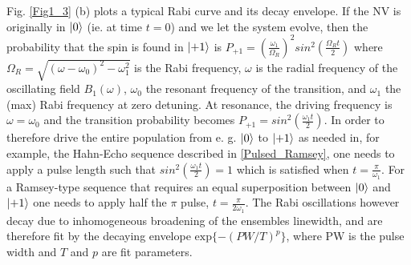 Fig. \ref{Fig1_3} (b) plots a typical Rabi curve and its decay envelope. If the NV is originally in $\ket{0}$ (ie. at time $t = 0$) and we let the system evolve, then the probability that the spin is found in $\ket{+1}$ is $P_{+1} = \left(\frac{\omega_1}{\Omega_R}\right)^2 sin^2\left(\frac{\Omega_R t}{2}\right)$ where $\Omega_R = \sqrt{(\omega-\omega_0)^2-\omega_1^2}$ is the Rabi frequency, $\omega$ is the radial frequency of the oscillating field $B_1(\omega)$, $\omega_0$ the resonant frequency of the transition, and $\omega_1$ the (max) Rabi frequency at zero detuning. At resonance, the driving frequency is $\omega = \omega_0$ and the transition probability becomes $P_{+1} = sin^2\left(\frac{\omega_1 t}{2}\right)$. In order to therefore drive the entire population from e. g. $\ket{0}$ to $\ket{+1}$ as needed in, for example, the Hahn-Echo sequence described in \ref{Pulsed_Ramsey}, one needs to apply a pulse length such that $sin^2 \left(\frac{\omega_1 t}{2}\right) = 1$ which is satisfied when $t = \frac{\pi}{\omega_1}$. For a Ramsey-type sequence that requires an equal superposition between $\ket{0}$ and $\ket{+1}$ one needs to apply half the $\pi$ pulse, $t = \frac{\pi}{2\omega_1}$. The Rabi oscillations however decay due to inhomogeneous broadening of the ensembles linewidth, and are therefore fit by the decaying envelope $\text{exp}\{-\left(PW/T\right)^p\}$, where PW is the pulse width and $T$ and $p$ are fit parameters.


